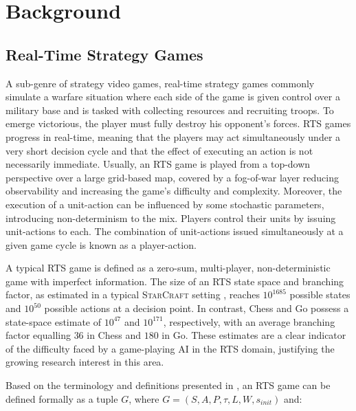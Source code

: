 \documentclass[conference]{IEEEtran}
\begin{document}

\section{Background}
\label{sec:background}

\subsection{Real-Time Strategy Games}

A sub-genre of strategy video games, real-time strategy games commonly simulate a warfare situation where each side of the game is given control over a military base and is tasked with collecting resources and recruiting troops.
 To emerge victorious, the player must fully destroy his opponent's forces. RTS games progress in real-time, meaning that the players may act simultaneously under a very short decision cycle and that the effect of executing an action is not necessarily immediate. Usually, an RTS game is played from a top-down perspective over a large grid-based map, covered by a fog-of-war layer reducing observability and increasing the game's difficulty and complexity. Moreover, the execution of a unit-action can be influenced by some stochastic parameters,
 introducing non-determinism to the mix. Players control their units by issuing unit-actions to each. The combination of unit-actions issued simultaneously at a given game cycle is known as a player-action.

A typical RTS game is defined as a zero-sum, multi-player, non-deterministic game with imperfect information. The size of an RTS state space and branching factor, as estimated in a typical \textsc{StarCraft} setting \cite{ontanon_survey_2013}, reaches $10^{1685}$ possible states and $10^{50}$ possible actions at a decision point. In contrast, Chess and Go possess a state-space estimate of $10^{47}$ and $10^{171}$, respectively, with an average branching factor equalling $36$ in Chess and $180$ in Go. These estimates are a clear indicator of the difficulty faced by a game-playing AI in the RTS domain, justifying the growing research interest in this area.

Based on the terminology and definitions presented in \cite{ontanon_combinatorial_2017}, an RTS game can be defined formally as a tuple $G$, where $G = (S, A, P, \tau, L, W, s_{init})$ and:
\end{document}

